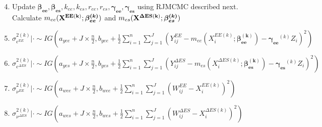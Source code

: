 \documentclass[handout]{beamer}\usepackage[]{graphicx}\usepackage[]{color}
\begin{document}
\begin{frame}

\begin{enumerate}
\setcounter{enumi}{3}
\small
\item
Update ${\boldsymbol{\beta_{ee}},\boldsymbol{\beta_{es}}},k_{ee},k_{es}, {  r_{ee}, r_{es}}, \boldsymbol{\gamma_{ee}^{}}, \boldsymbol{\gamma_{es}^{}}$ using RJMCMC described next. Calculate $m_{ee}({\bf X^{EE(k)}};\boldsymbol{\beta_{ee}^{(k)}})$ and $m_{es}({\bf X^{\Delta ES(k)}};\boldsymbol{\beta_{es}^{(k)}})$ \\

\vspace{0.2cm}

\item
 $\sigma^{2(k)}_{\epsilon^{EE}} |\cdot \sim IG(a_{yee}+J\times \frac{n}{2},b_{yee}+\frac{1}{2}\sum_{i=1}^{n}\sum_{j=1}^{J}(Y_{ij}^{EE}-m_{ee}(X_i^{EE(k)};\boldsymbol{\beta_{ee}^{(k)}})-\boldsymbol{\gamma_{ee}}^{(k)}Z_i)^2)$ \\
 
\vspace{0.2cm}

\item
 $\sigma^{2(k)}_{\epsilon^{\Delta ES}} |\cdot \sim IG(a_{yes}+J\times \frac{n}{2},b_{yes}+\frac{1}{2}\sum_{i=1}^{n}\sum_{j=1}^{J}(Y_{ij}^{\Delta ES}-m_{es}(X_i^{\Delta ES(k)};\boldsymbol{\beta_{es}^{(k)}})-\boldsymbol{\gamma_{es}}^{(k)}Z_i)^2)$ \\
 
 \vspace{0.2cm}
 
\item
 $\sigma^{2(k)}_{\nu^{EE}} |\cdot \sim IG(a_{wee}+J\times \frac{n}{2},b_{wee}+\frac{1}{2}\sum_{i=1}^{n}\sum_{j=1}^{J}(W_{ij}^{EE}-X_i^{EE(k)})^2)$ \\
 
 \vspace{0.2cm}
 
\item
 $\sigma^{2(k)}_{\nu^{\Delta ES}} |\cdot \sim IG(a_{wes}+J\times \frac{n}{2},b_{wes}+\frac{1}{2}\sum_{i=1}^{n}\sum_{j=1}^{J}(W_{ij}^{\Delta ES}-X_i^{\Delta ES(k)})^2)$ \\
 
 \end{enumerate}


\end{frame}
\end{document}
